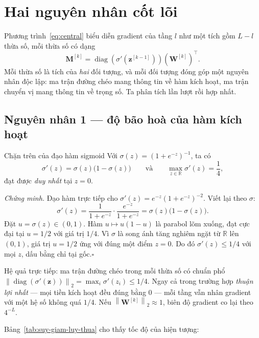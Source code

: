 \section{Hai nguyên nhân cốt lõi}
\label{sec:nguyennhan}

Phương trình~\eqref{eq:central} biểu diễn gradient của tầng $l$ như một tích gồm
$L-l$ thừa số, mỗi thừa số có dạng
\[
  \mathbf{M}^{[k]}
  = \operatorname{diag}\!\left(\sigma'\!\left(\mathbf{z}^{[k-1]}\right)\right)
    \left(\mathbf{W}^{[k]}\right)^{\!\top}.
\]
Mỗi thừa số là tích của \emph{hai} đối tượng, và mỗi đối tượng đóng góp một
nguyên nhân độc lập: ma trận đường chéo mang thông tin về hàm kích hoạt, ma trận
chuyển vị mang thông tin về trọng số. Ta phân tích lần lượt rồi hợp nhất.

\subsection{Nguyên nhân 1 --- độ bão hoà của hàm kích hoạt}

\begin{infobox}{Chặn trên của đạo hàm sigmoid}
Với $\sigma(z) = \left(1+e^{-z}\right)^{-1}$, ta có
\[
  \sigma'(z) = \sigma(z)\bigl(1-\sigma(z)\bigr)
  \qquad\text{và}\qquad
  \max_{z\in\mathbb{R}}\sigma'(z) = \frac{1}{4},
\]
đạt được \emph{duy nhất} tại $z = 0$.
\end{infobox}

\noindent\textit{Chứng minh.}\;
Đạo hàm trực tiếp cho
$\sigma'(z) = e^{-z}\left(1+e^{-z}\right)^{-2}$. Viết lại theo $\sigma$:
\[
  \sigma'(z)
  = \frac{1}{1+e^{-z}}\cdot\frac{e^{-z}}{1+e^{-z}}
  = \sigma(z)\bigl(1-\sigma(z)\bigr).
\]
Đặt $u = \sigma(z)\in(0,1)$. Hàm $u\mapsto u(1-u)$ là parabol lõm xuống, đạt cực
đại tại $u = 1/2$ với giá trị $1/4$. Vì $\sigma$ là song ánh tăng nghiêm ngặt từ
$\mathbb{R}$ lên $(0,1)$, giá trị $u = 1/2$ ứng với đúng một điểm $z = 0$. Do đó
$\sigma'(z)\le 1/4$ với mọi $z$, dấu bằng chỉ tại gốc.\hfill$\square$

\medskip
Hệ quả trực tiếp: ma trận đường chéo trong mỗi thừa số có chuẩn phổ
$\left\|\operatorname{diag}(\sigma'(\mathbf{z}))\right\|_2
= \max_i \sigma'(z_i) \le 1/4$. Ngay cả trong trường hợp \emph{thuận lợi nhất}
--- mọi tiền kích hoạt đều đúng bằng $0$ --- mỗi tầng vẫn nhân gradient với một
hệ số không quá $1/4$. Nếu $\left\|\mathbf{W}^{[k]}\right\|_2 \approx 1$, biên độ
gradient co lại theo $4^{-L}$.

\medskip
\noindent Bảng~\ref{tab:suy-giam-luy-thua} cho thấy tốc độ của hiện tượng:

